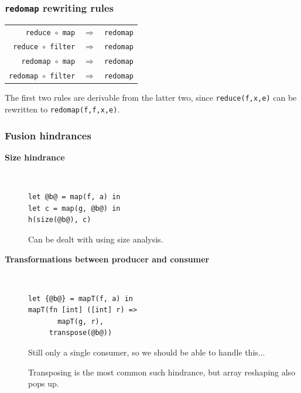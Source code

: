 \documentclass[rgb,dvipsnames]{beamer}
\begin{document}
\begin{frame}
  \frametitle{\texttt{redomap} rewriting rules}

  \begin{center}
    \begin{tabular}{rcl}
      \texttt{reduce $\circ$ map}    & $\Rightarrow$ & \texttt{redomap} \\
      \texttt{reduce $\circ$ filter}    & $\Rightarrow$ & \texttt{redomap} \\
      \texttt{redomap $\circ$ map}    & $\Rightarrow$ & \texttt{redomap} \\
      \texttt{redomap $\circ$ filter}    & $\Rightarrow$ & \texttt{redomap} \\
    \end{tabular}
  \end{center}

  The first two rules are derivable from the latter two, since
  \texttt{reduce(f,x,e)} can be rewritten to \texttt{redomap(f,f,x,e)}.

\end{frame}

\begin{frame}[fragile]
\frametitle{Fusion hindrances}

\begin{description}
\item[\bf Size hindrance]\hfill\\
\begin{lstlisting}
let @b@ = map(f, a) in
let c = map(g, @b@) in
h(size(@b@), c)
\end{lstlisting}

Can be dealt with using size analysis.

\item[\bf Transformations between producer and consumer]\hfill\\

\begin{lstlisting}
let {@b@} = mapT(f, a) in
mapT(fn [int] ([int] r) =>
       mapT(g, r),
     transpose(@b@))
\end{lstlisting}

  Still only a single consumer, so we should be able to handle this...

  Transposing is the most common such hindrance, but array reshaping
  also pops up.

\end{description}

\end{frame}
\end{document}
